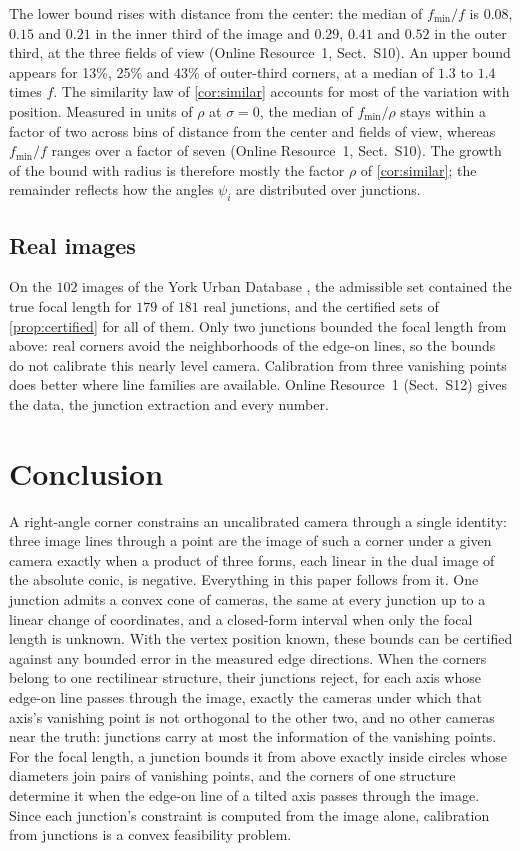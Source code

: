 \documentclass[pdflatex,sn-mathphys-num,iicol]{sn-jnl}
\newcommand{\fmin}{f_{\min}}
\newcommand{\OR}{Online Resource~1}
\theoremstyle{thmstyleone}
\theoremstyle{thmstylethree}
\theoremstyle{thmstyletwo}
\begin{document}
The lower bound rises with distance from the center: the median of $\fmin/f$ is $0.08$, $0.15$ and $0.21$ in the inner third of the image and $0.29$, $0.41$ and $0.52$ in the outer third, at the three fields of view (\OR, Sect.~S10). An upper bound appears for 13\%, 25\% and 43\% of outer-third corners, at a median of $1.3$ to $1.4$ times $f$. The similarity law of \cref{cor:similar} accounts for most of the variation with position. Measured in units of $\rho$ at $\sigma=0$, the median of $\fmin/\rho$ stays within a factor of two across bins of distance from the center and fields of view, whereas $\fmin/f$ ranges over a factor of seven (\OR, Sect.~S10). The growth of the bound with radius is therefore mostly the factor $\rho$ of \cref{cor:similar}; the remainder reflects how the angles $\psi_i$ are distributed over junctions.

\subsection{Real images}\label{sec:realsummary}

On the $102$ images of the York Urban Database \citep{denis2008}, the admissible set contained the true focal length for $179$ of $181$ real junctions, and the certified sets of \cref{prop:certified} for all of them. Only two junctions bounded the focal length from above: real corners avoid the neighborhoods of the edge-on lines, so the bounds do not calibrate this nearly level camera. Calibration from three vanishing points does better where line families are available. \OR{} (Sect.~S12) gives the data, the junction extraction and every number.

\section{Conclusion}\label{sec:conclusion}

A right-angle corner constrains an uncalibrated camera through a single identity: three image lines through a point are the image of such a corner under a given camera exactly when a product of three forms, each linear in the dual image of the absolute conic, is negative. Everything in this paper follows from it. One junction admits a convex cone of cameras, the same at every junction up to a linear change of coordinates, and a closed-form interval when only the focal length is unknown. With the vertex position known, these bounds can be certified against any bounded error in the measured edge directions. When the corners belong to one rectilinear structure, their junctions reject, for each axis whose edge-on line passes through the image, exactly the cameras under which that axis's vanishing point is not orthogonal to the other two, and no other cameras near the truth: junctions carry at most the information of the vanishing points. For the focal length, a junction bounds it from above exactly inside circles whose diameters join pairs of vanishing points, and the corners of one structure determine it when the edge-on line of a tilted axis passes through the image. Since each junction's constraint is computed from the image alone, calibration from junctions is a convex feasibility problem.
\end{document}

